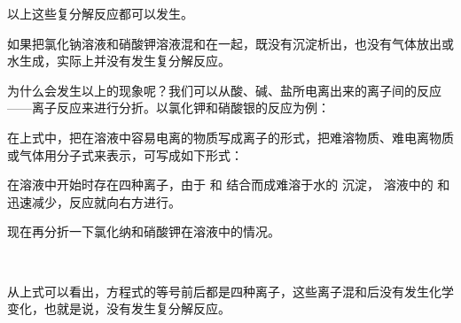 以上这些复分解反应都可以发生。

如果把氯化钠溶液和硝酸钾溶液混和在一起，既没有沉淀析出，也没有气体放出或水生成，实际上并没有发生复分解反应。

\begin{yuedu}
    为什么会发生以上的现象呢？我们可以从酸、碱、盐所电离出来的离子间的反应——离子反应来进行分折。以氯化钾和硝酸银的反应为例：
    \begin{fangchengshi}
    \end{fangchengshi}

    在上式中，把在溶液中容易电离的物质写成离子的形式，把难溶物质、难电离物质或气体用分子式来表示，可写成如下形式：
    \begin{fangchengshi}
    \end{fangchengshi}

    在溶液中开始时存在四种离子，由于  和  结合而成难溶于水的  沉淀，
    溶液中的  和  迅速减少，反应就向右方进行。

    现在再分折一下氯化纳和硝酸钾在溶液中的情况。
    \begin{fangchengshi}
         \\[-.5em]
    \end{fangchengshi}

    从上式可以看出，方程式的等号前后都是四种离子，这些离子混和后没有发生化学变化，也就是说，没有发生复分解反应。
\end{yuedu}



